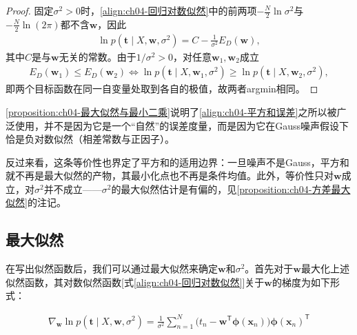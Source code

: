 \documentclass[../../main.tex]{subfiles}
\begin{document}
\begin{proof}
固定$\sigma^2>0$时，\eqref{align:ch04-回归对数似然}中的前两项$-\frac{N}{2}\ln\sigma^2$与$-\frac{N}{2}\ln(2\pi)$都不含$\boldsymbol{w}$，因此
\begin{align*}
  \ln p(\boldsymbol{t}\mid X,\boldsymbol{w},\sigma^2)=C-\frac{1}{\sigma^2}E_D(\boldsymbol{w}),
\end{align*}
其中$C$是与$\boldsymbol{w}$无关的常数。由于$1/\sigma^2>0$，对任意$\boldsymbol{w}_1,\boldsymbol{w}_2$成立
\begin{align*}
  E_D(\boldsymbol{w}_1)\leqslant E_D(\boldsymbol{w}_2)\iff\ln p(\boldsymbol{t}\mid X,\boldsymbol{w}_1,\sigma^2)\geqslant\ln p(\boldsymbol{t}\mid X,\boldsymbol{w}_2,\sigma^2),
\end{align*}
即两个目标函数在同一自变量处取到各自的极值，故两者argmin相同。
\end{proof}

\begin{remark}
\cref{proposition:ch04-最大似然与最小二乘}说明了\eqref{align:ch04-平方和误差}之所以被广泛使用，并不是因为它是一个“自然”的误差度量，而是因为它在Gauss噪声假设下恰是负对数似然（相差常数与正因子）。

反过来看，这条等价性也界定了平方和的适用边界：一旦噪声不是Gauss，平方和就不再是最大似然的产物，其最小化点也不再是条件均值。此外，等价性只对$\boldsymbol{w}$成立，对$\sigma^2$并不成立——$\sigma^2$的最大似然估计是有偏的，见\cref{proposition:ch04-方差最大似然}的注记。
\end{remark}

\subsection{最大似然}\label{subsection:ch04-最大似然}

在写出似然函数后，我们可以通过最大似然来确定$\boldsymbol{w}$和$\sigma^2$。首先对于$\boldsymbol{w}$最大化上述似然函数，其对数似然函数[式\eqref{align:ch04-回归对数似然}]关于$\boldsymbol{w}$的梯度为如下形式：

\begin{align}
  \nabla_{\boldsymbol{w}}\ln p(\boldsymbol{t}\mid X,\boldsymbol{w},\sigma^2)
  =\frac{1}{\sigma^2}\sum_{n=1}^{N}\bigl(t_n-\boldsymbol{w}^{\mathsf{T}}\boldsymbol{\phi}(\boldsymbol{x}_n)\bigr)\boldsymbol{\phi}(\boldsymbol{x}_n)^{\mathsf{T}}
  \label{align:ch04-似然梯度}
\end{align}
\end{document}
